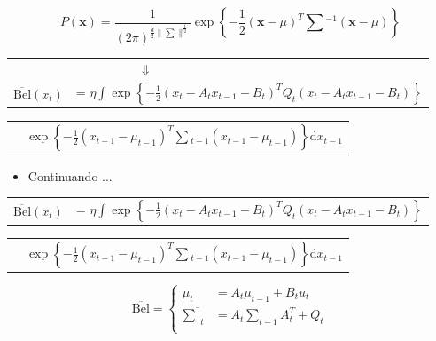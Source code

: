     \begin{equation*}
        P(\mathbf{x}) = \frac{1}{(2\pi)^{\frac{d}{2}\|\sum\|^{\frac{1}{2}}}}\exp\left\{-\frac{1}{2} (\mathbf{x}-\mu)^T\textstyle\sum{}^{-1}(\mathbf{x}-\mu)\right\}
    \end{equation*}        


\begin{tabular}{p{1.2cm} l}
    & $\quad\quad\quad\quad\quad \Downarrow$\\
    $\overline{\text{Bel}}(x_t)$  & = $\eta \displaystyle\int \exp\left\{  -\frac{1}{2} \left(x_t - A_t x_{t-1} - B_t\right)^T Q_t \left(x_t - A_t x_{t-1} - B_t\right)  \right\}$ \\
\end{tabular}

\begin{tabular}{p{2.3cm} l}
    & $\exp\left\{ -\displaystyle\frac{1}{2} \left(x_{t-1} - \mu_{t-1}\right)^T \textstyle\sum {}_{t-1} \left(x_{t-1} - \mu_{t-1}\right)  \right\}\text{d}x_{t-1}$
\end{tabular}    



\begin{itemize}
    \item Continuando ...
\end{itemize}

\begin{tabular}{p{1.2cm} l}      
    $\overline{\text{Bel}}(x_t)$  & = $\eta \displaystyle\int \exp\left\{  -\frac{1}{2} \left(x_t - A_t x_{t-1} - B_t\right)^T Q_t \left(x_t - A_t x_{t-1} - B_t\right)  \right\}$ \\
\end{tabular}
    
\begin{tabular}{p{2.3cm} l}
    & $\exp\left\{ -\displaystyle\frac{1}{2} \left(x_{t-1} - \mu_{t-1}\right)^T \textstyle\sum {}_{t-1} \left(x_{t-1} - \mu_{t-1}\right)  \right\}\text{d}x_{t-1}$
\end{tabular}    


\begin{equation}
    \overline{\text{Bel}} = 
    \left\{
    \begin{aligned}
            \overline{\mu}_t & = A_t\mu_{t-1} + B_t u_t\\
            \overline{\textstyle\sum}_t & = A_t {\textstyle\sum}_{t-1} A_t^T+ Q_t\\
    \end{aligned} \right.
\end{equation}


